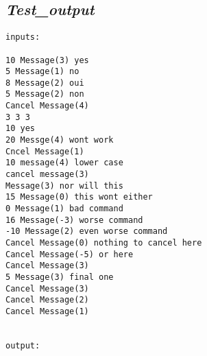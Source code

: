 \documentclass[11pt]{article}
\begin{document}
	\subsection{\emph{Test\_output}}
	\begin{Verbatim}[tabsize=8]
inputs:

10 Message(3) yes
5 Message(1) no
8 Message(2) oui
5 Message(2) non
Cancel Message(4)
3 3 3
10 yes
20 Messge(4) wont work
Cncel Message(1)
10 message(4) lower case
cancel message(3)
Message(3) nor will this
15 Message(0) this wont either
0 Message(1) bad command
16 Message(-3) worse command
-10 Message(2) even worse command
Cancel Message(0) nothing to cancel here
Cancel Message(-5) or here
Cancel Message(3)
5 Message(3) final one
Cancel Message(3)
Cancel Message(2)
Cancel Message(1)


output:


\end{Verbatim}
\end{document}
